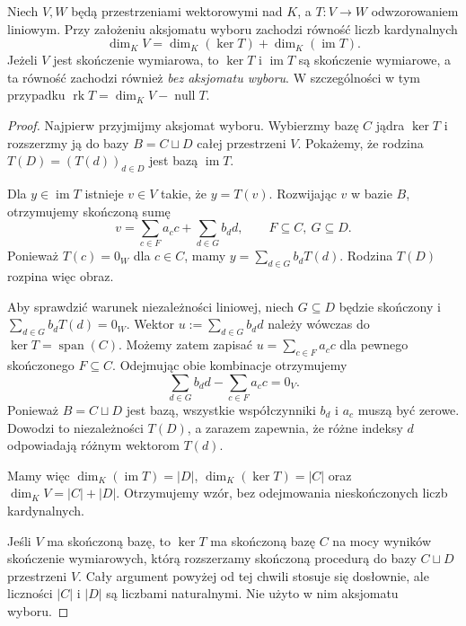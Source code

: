 \begin{twierdzenie}
\label{thm:lin3-rzad-nullity}
Niech \(V,W\) będą przestrzeniami wektorowymi
nad \(K\), a \(T\colon V\to W\) odwzorowaniem liniowym.
Przy założeniu aksjomatu wyboru zachodzi
równość liczb kardynalnych
\[
 \dim_K V=\dim_K(\ker T)+\dim_K(\operatorname{im}T).
\]
Jeżeli \(V\) jest skończenie wymiarowa,
to \(\ker T\) i \(\operatorname{im}T\)
są skończenie wymiarowe, a ta równość
zachodzi również \emph{bez aksjomatu wyboru}.
W szczególności w tym przypadku
\(\operatorname{rk}T=\dim_KV-\operatorname{null}T\).
\end{twierdzenie}
\begin{proof}
Najpierw przyjmijmy aksjomat wyboru.
Wybierzmy bazę \(C\) jądra \(\ker T\)
i rozszerzmy ją do bazy \(B=C\sqcup D\)
całej przestrzeni \(V\).
Pokażemy, że rodzina \(T(D)=(T(d))_{d\in D}\)
jest bazą \(\operatorname{im}T\).

Dla \(y\in\operatorname{im}T\) istnieje \(v\in V\)
takie, że \(y=T(v)\). Rozwijając \(v\) w bazie \(B\),
otrzymujemy skończoną sumę
\[
 v=\sum_{c\in F}a_cc+\sum_{d\in G}b_dd,
 \qquad F\subseteq C,\ G\subseteq D.
\]
Ponieważ \(T(c)=0_W\) dla \(c\in C\),
mamy \(y=\sum_{d\in G}b_dT(d)\).
Rodzina \(T(D)\) rozpina więc obraz.

Aby sprawdzić warunek niezależności liniowej,
niech \(G\subseteq D\) będzie skończony i
\(\sum_{d\in G}b_dT(d)=0_W\).
Wektor \(u:=\sum_{d\in G}b_dd\) należy
wówczas do \(\ker T=\operatorname{span}(C)\).
Możemy zatem zapisać \(u=\sum_{c\in F}a_cc\)
dla pewnego skończonego \(F\subseteq C\).
Odejmując obie kombinacje otrzymujemy
\[
 \sum_{d\in G}b_dd-\sum_{c\in F}a_cc=0_V.
\]
Ponieważ \(B=C\sqcup D\) jest bazą,
wszystkie współczynniki \(b_d\) i \(a_c\)
muszą być zerowe. Dowodzi to niezależności \(T(D)\),
a zarazem zapewnia, że różne indeksy \(d\)
odpowiadają różnym wektorom \(T(d)\).

Mamy więc \(\dim_K(\operatorname{im}T)=|D|\),
\(\dim_K(\ker T)=|C|\) oraz
\(\dim_KV=|C|+|D|\).
Otrzymujemy wzór, bez odejmowania
nieskończonych liczb kardynalnych.

Jeśli \(V\) ma skończoną bazę, to
\(\ker T\) ma skończoną bazę \(C\)
na mocy wyników skończenie wymiarowych,
którą rozszerzamy skończoną procedurą
do bazy \(C\sqcup D\) przestrzeni \(V\).
Cały argument powyżej od tej chwili
stosuje się dosłownie, ale liczności
\(|C|\) i \(|D|\) są liczbami naturalnymi.
Nie użyto w nim aksjomatu wyboru.
\end{proof}

